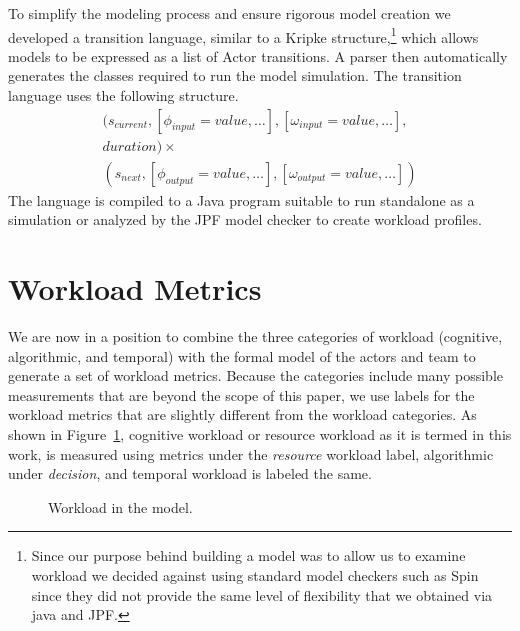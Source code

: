 To simplify the modeling process and ensure rigorous model creation we
developed a transition language, similar to a Kripke structure,\footnote{Since our purpose behind building a model was to allow us to examine workload we decided against using standard model checkers such as Spin since they did not provide the same level of flexibility that we obtained via java and JPF.}  which allows
models to be expressed as a list of Actor transitions.  A parser then
automatically generates the classes required to run the model simulation.
The transition language uses the following structure.
\begin{equation}
\begin{split}
(s_{current}, [\phi_{input} = value,\ldots], [\omega_{input} = value,\ldots],\\
duration) \times \\
(s_{next}, [\phi_{output} =
value,\ldots], [\omega_{output} = value,\ldots])
\end{split}
\end{equation}
\noindent The language is compiled to a Java program suitable to run standalone
as a simulation or analyzed by the JPF model checker to create
workload profiles.

\section{Workload Metrics}

We are now in a position to combine the three categories of workload (cognitive, algorithmic, and temporal) with the formal model of the actors and team to generate a set of workload metrics.  Because the categories include many possible measurements that are beyond the scope of this paper, we use labels for the workload metrics that are slightly different from the workload categories.  As shown in Figure~\ref{fig:WorkloadMetrics}, cognitive workload or resource workload as it is termed in this work, is measured using metrics under the {\em resource} workload label, algorithmic under {\em decision}, and temporal workload is labeled the same. 


\begin{figure}[h]
\center
\setlength{\abovecaptionskip}{1mm}
\setlength{\belowcaptionskip}{1mm}
\setlength{\textfloatsep}{1mm}
\setlength{\floatsep}{1mm}
\caption{Workload in the model.}
\label{fig:WorkloadMetrics}
\end{figure}

